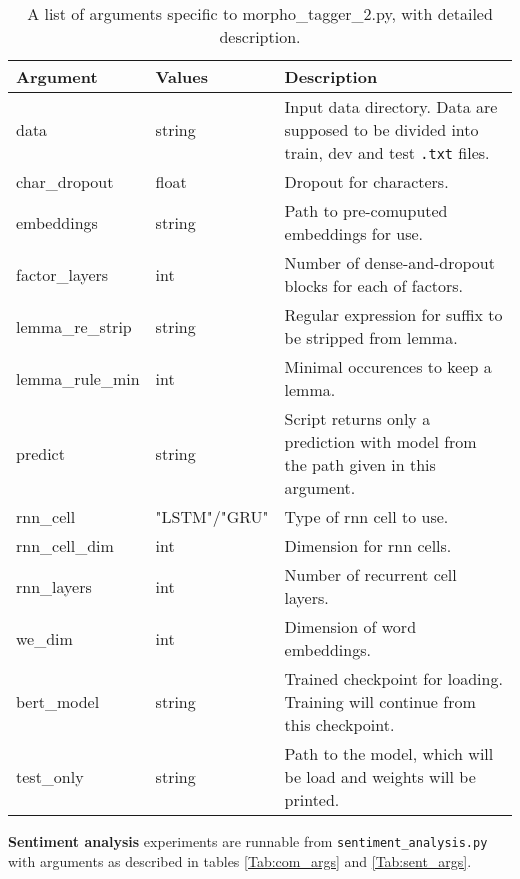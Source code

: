 \begin{table}
\centering
\label{Tab:mt2_args}
\begin{tabular}{ |p{3cm}|p{}|p{6cm}| } 
 \hline
 Argument & Values & Description \\ 
 \hline \hline
 data & string &  Input data directory. Data are supposed to be divided into train, dev and test \texttt{.txt} files. \\ \hline
 char\_dropout &  float &  Dropout for characters. \\ \hline
embeddings & string & Path to pre-comuputed embeddings for use. \\ \hline
factor\_layers & int & Number of dense-and-dropout blocks for each of factors.  \\ \hline
lemma\_re\_strip &  string & Regular expression for suffix to be stripped from lemma. \\ \hline
lemma\_rule\_min & int & Minimal occurences to keep a lemma.  \\ \hline
predict & string & Script returns only a prediction with model from the path given in this argument.  \\ \hline
rnn\_cell & "LSTM"/"GRU" & Type of rnn cell to use. \\ \hline
rnn\_cell\_dim & int & Dimension for rnn cells.  \\ \hline
rnn\_layers& int & Number of recurrent cell layers.  \\ \hline
we\_dim & int & Dimension of word embeddings.  \\ \hline  


bert\_model & string & Trained checkpoint for loading. Training will continue from this checkpoint. \\ \hline

test\_only & string & Path to the model, which will be load and weights will be printed.  \\ \hline
 \hline
\end{tabular}
\caption{A list of arguments specific to morpho\_tagger\_2.py, with detailed description.} 
\end{table}

\textbf{Sentiment analysis} experiments are runnable from \texttt{sentiment\_analysis.py} with arguments as described in tables \ref{Tab:com_args} and \ref{Tab:sent_args}.

